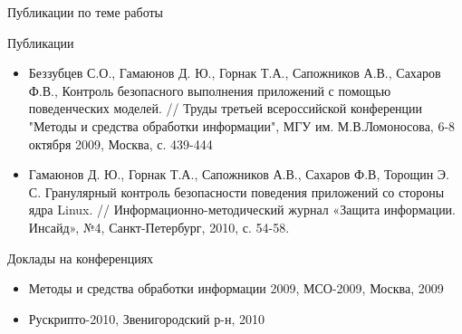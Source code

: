 \documentclass{beamer}
\begin{document}
\begin{frame}{Публикации по теме работы}

\begin{tiny}
\begin{block}{Публикации}
\begin{itemize}
\item Беззубцев С.О., Гамаюнов Д. Ю., Горнак Т.А., Сапожников А.В., Сахаров Ф.В., Контроль безопасного выполнения приложений с помощью поведенческих моделей. // Труды третьей всероссийской конференции "Методы и средства обработки информации", МГУ им. М.В.Ломоносова, 6-8 октября 2009, Москва, с. 439-444
\item Гамаюнов Д. Ю., Горнак Т.А., Сапожников А.В., Сахаров Ф.В, Торощин Э. С. Гранулярный контроль безопасности поведения приложений со стороны ядра Linux. // Информационно-методический журнал «Защита информации. Инсайд», №4, Санкт-Петербург, 2010, с. 54-58.


\end{itemize}
\end{block}

\begin{block}{Доклады на конференциях}
\begin{itemize}
\item Методы и средства обработки информации 2009, МСО-2009, Москва, 2009
\item Рускрипто-2010, Звенигородский р-н, 2010
\end{itemize}

\end{block}
\end{tiny}
\end{frame}

\begin{comment}
\end{comment}

\begin{comment}
  \begin{frame}{Спасибо за внимание. Вопросы?}
\begin{center}
\LARGE{Спасибо за внимание. Вопросы?}
\end{center}

   
  \end{frame}
\end{comment}

 
\end{document}
